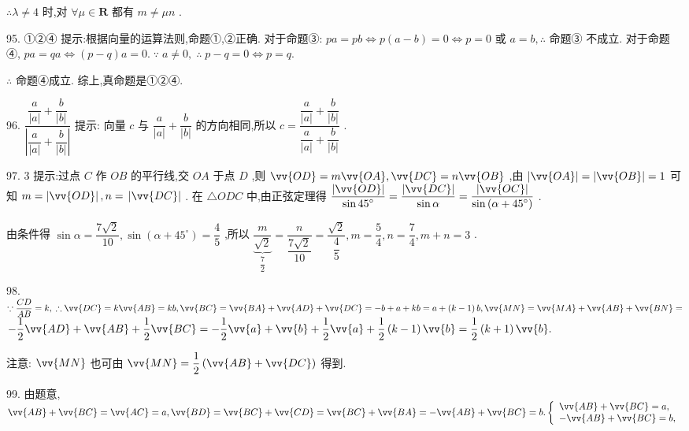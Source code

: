 $\therefore \lambda  \neq  4$ 时,对 $\forall \mu  \in  \mathbf{R}$ 都有 $m \neq  {\mu n}$ .

95. ①②④ 提示:根据向量的运算法则,命题①,②正确. 对于命题③: ${pa} = {pb} \Leftrightarrow  p\left( {a - b}\right)  = 0 \Leftrightarrow  p = 0$ 或 $a = b,\therefore$ 命题③ 不成立. 对于命题④, ${pa} = {qa} \Leftrightarrow  \left( {p - q}\right) a = 0.\;\because \;a \neq  0,\;\therefore \;p - q = 0 \Leftrightarrow  p = q.$

$\therefore$ 命题④成立. 综上,真命题是①②④.

96. $\dfrac{\dfrac{a}{\left| a\right| } + \dfrac{b}{\left| b\right| }}{\left| \dfrac{a}{\left| a\right| } + \dfrac{b}{\left| b\right| }\right| }$ 提示: 向量 $c$ 与 $\dfrac{a}{\left| a\right| } + \dfrac{b}{\left| b\right| }$ 的方向相同,所以 $c = \dfrac{\dfrac{a}{\left| a\right| } + \dfrac{b}{\left| b\right| }}{\dfrac{a}{\left| a\right| } + \dfrac{b}{\left| b\right| }}$ .

97. 3 提示:过点 $C$ 作 ${OB}$ 的平行线,交 ${OA}$ 于点 $D$ ,则 $\vv{OD} = m\vv{OA},\vv{DC} = n\vv{OB}$ ,由 $\left| \vv{OA}\right|  = \left| \vv{OB}\right|  = 1$ 可知 $m = \left| \vv{OD}\right| ,n =$  $\left| \vv{DC}\right|$ . 在 $\bigtriangleup {ODC}$ 中,由正弦定理得 $\dfrac{\left| \vv{OD}\right| }{\sin {45}^{ \circ  }} = \dfrac{\left| \vv{DC}\right| }{\sin \alpha } = \dfrac{\left| \vv{OC}\right| }{\sin \left( {\alpha  + {45}^{ \circ  }}\right) }$ .

由条件得 $\sin \alpha  = \dfrac{7\sqrt{2}}{10},\sin \left( {\alpha  + {45}^{ \circ  }}\right)  = \dfrac{4}{5}$ ,所以 $\underset{\dfrac{7}{2}}{\underbrace{\dfrac{m}{\sqrt{2}}}} = \dfrac{n}{\dfrac{7\sqrt{2}}{10}} = \dfrac{\sqrt{2}}{\dfrac{4}{5}},m = \dfrac{5}{4},n = \dfrac{7}{4},m + n = 3$ .

98. $\because \dfrac{CD}{AB} = k,\;\therefore \vv{DC} = k\vv{AB} = {kb},\vv{BC} = \vv{BA} + \vv{AD} + \vv{DC} =  - b + a + {kb} = a + \left( {k - 1}\right) b,\vv{MN} = \vv{MA} + \vv{AB} + \vv{BN} =$  $- \dfrac{1}{2}\vv{AD} + \vv{AB} + \dfrac{1}{2}\vv{BC} =  - \dfrac{1}{2}\vv{a} + \vv{b} + \dfrac{1}{2}\vv{a} + \dfrac{1}{2}\left( {k - 1}\right) \vv{b} = \dfrac{1}{2}\left( {k + 1}\right) \vv{b}.$

注意: $\vv{MN}$ 也可由 $\vv{MN} = \dfrac{1}{2}\left( {\vv{AB} + \vv{DC}}\right)$ 得到.

99. 由题意, $\vv{AB} + \vv{BC} = \vv{AC} = a,\vv{BD} = \vv{BC} + \vv{CD} = \vv{BC} + \vv{BA} =  - \vv{AB} + \vv{BC} = b.\left\{  \begin{array}{l} \vv{AB} + \vv{BC} = a, \\   - \vv{AB} + \vv{BC} = b, \end{array}\right.$

